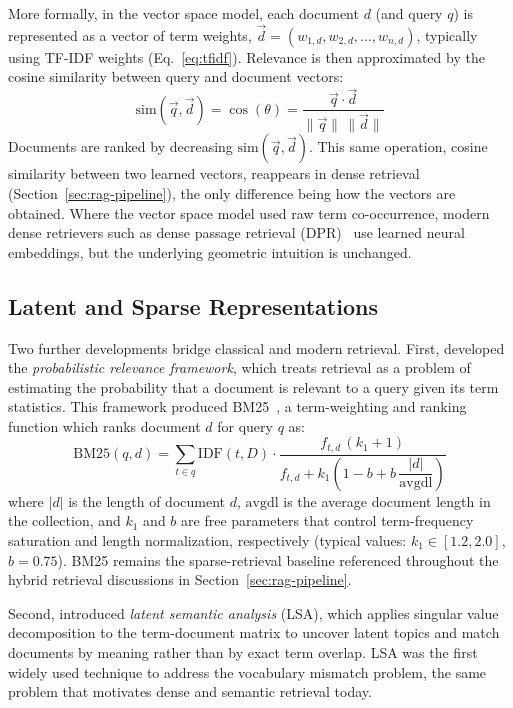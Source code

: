 More formally, in the vector space model, each document $d$ (and query $q$) is represented as a vector of term weights, $\vec{d} = (w_{1,d}, w_{2,d}, \dots, w_{n,d})$, typically using TF-IDF weights (Eq.~\ref{eq:tfidf}). Relevance is then approximated by the cosine similarity between query and document vectors:
\begin{equation}
\mathrm{sim}(\vec{q}, \vec{d}) = \cos(\theta) = \frac{\vec{q} \cdot \vec{d}}{\lVert \vec{q} \rVert \, \lVert \vec{d} \rVert}
\label{eq:cosinerag}
\end{equation}
Documents are ranked by decreasing $\mathrm{sim}(\vec{q}, \vec{d})$. This same operation, cosine similarity between two learned vectors, reappears in dense retrieval (Section~\ref{sec:rag-pipeline}), the only difference being how the vectors are obtained.
Where the vector space model used raw term co-occurrence, modern dense retrievers such as dense passage retrieval (DPR)~\citep{karpukhin2020dense} use learned neural embeddings, but the underlying geometric intuition is unchanged.

\subsection{Latent and Sparse Representations}

Two further developments bridge classical and modern retrieval. First, \citet{robertson2009probabilistic} developed the \emph{probabilistic relevance framework}, which treats retrieval as a problem of estimating the probability that a document is relevant to a query given its term statistics. This framework produced BM25~\cite{robertson1994okapi}, a term-weighting and ranking function which ranks document $d$ for query $q$ as:
\begin{equation}
\mathrm{BM25}(q,d) = \sum_{t \in q} \mathrm{IDF}(t,D) \cdot
\frac{f_{t,d} \, (k_1 + 1)}{f_{t,d} + k_1 \left(1 - b + b \, \dfrac{|d|}{\mathrm{avgdl}}\right)}
\label{eq:bm25}
\end{equation}
where $|d|$ is the length of document $d$, $\mathrm{avgdl}$ is the average document length in the collection, and $k_1$ and $b$ are free parameters that control term-frequency saturation and length normalization, respectively (typical values: $k_1 \in [1.2, 2.0]$, $b = 0.75$). BM25 remains the sparse-retrieval baseline referenced throughout the hybrid retrieval discussions in Section~\ref{sec:rag-pipeline}.

Second, \citet{deerwester1990indexing} introduced \emph{latent semantic analysis} (LSA), which applies singular value decomposition to the term-document matrix to uncover latent topics and match documents by meaning rather than by exact term overlap. LSA was the first widely used technique to address the vocabulary mismatch problem, the same problem that motivates dense and semantic retrieval today.

